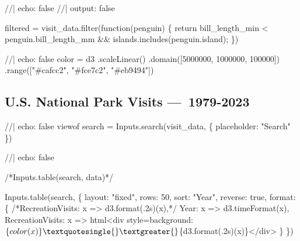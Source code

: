 \documentclass[
  letterpaper,
  DIV=11,
  numbers=noendperiod]{scrartcl}
\newenvironment{Shaded}{\begin{snugshade}}{\end{snugshade}}
\newcommand{\NormalTok}[1]{\textcolor[rgb]{0.00,0.23,0.31}{#1}}
\begin{document}
\begin{Shaded}
\begin{Highlighting}[]
\NormalTok{//| echo: false}
\NormalTok{//| output: false}


\NormalTok{filtered = visit\_data.filter(function(penguin) \{}
\NormalTok{  return bill\_length\_min \textless{} penguin.bill\_length\_mm \&\&}
\NormalTok{         islands.includes(penguin.island);}
\NormalTok{\})}
\end{Highlighting}
\end{Shaded}

\begin{Shaded}
\begin{Highlighting}[]
\NormalTok{//| echo: false}
\NormalTok{color = d3}
\NormalTok{  .scaleLinear()}
\NormalTok{  .domain([5000000, 1000000, 100000])}
\NormalTok{  .range(["\#cafcc2", "\#fce7c2", "\#eb9494"])}
\end{Highlighting}
\end{Shaded}

\subsection{U.S. National Park Visits
---~1979-2023}\label{u.s.-national-park-visits-1979-2023}

\begin{Shaded}
\begin{Highlighting}[]
\NormalTok{//| echo: false}
\NormalTok{viewof search = Inputs.search(visit\_data, \{}
\NormalTok{  placeholder: "Search"}
\NormalTok{\})}
\end{Highlighting}
\end{Shaded}

\begin{Shaded}
\begin{Highlighting}[]
\NormalTok{//| echo: false}

\NormalTok{/*Inputs.table(search, data)*/}

\NormalTok{Inputs.table(search, \{}
\NormalTok{  layout: "fixed",}
\NormalTok{  rows: 50,}
\NormalTok{  sort: "Year",}
\NormalTok{  reverse: true,}
\NormalTok{  format: \{}
\NormalTok{    /*RecreationVisits: x =\textgreater{} d3.format(\textquotesingle{}.2s\textquotesingle{})(x),*/}
\NormalTok{    Year: x =\textgreater{} d3.timeFormat(x),}
\NormalTok{    RecreationVisits: x =\textgreater{} html\textasciigrave{}\textless{}div style=\textquotesingle{}background:$\{color(x)\}\textquotesingle{}\textgreater{}$\{d3.format(\textquotesingle{}.2s\textquotesingle{})(x)\}\textless{}/div\textgreater{}\textasciigrave{}}
\NormalTok{  \}}
\NormalTok{\})}
\end{Highlighting}
\end{Shaded}
\end{document}

